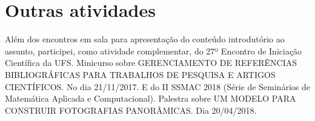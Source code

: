 \documentclass[12pt, a4paper]{article}
\begin{document}
\newpage

\section{Outras atividades}
Além dos encontros em sala para apresentação do conteúdo introdutório ao assunto,
participei, como atividade complementar, do 27º Encontro de Iniciação Científica da UFS.
Minicurso sobre GERENCIAMENTO DE REFERÊNCIAS BIBLIOGRÁFICAS PARA
TRABALHOS DE PESQUISA E ARTIGOS CIENTÍFICOS. No dia 21/11/2017. E do II SSMAC 2018 (Série de Seminários de Matemática Aplicada e Computacional). Palestra sobre UM MODELO PARA CONSTRUIR FOTOGRAFIAS PANORÂMICAS. Dia 20/04/2018.\

\newpage



\end{document}
